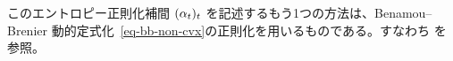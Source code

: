 このエントロピー正則化補間 $(\alpha_t)_t$ を記述するもう1つの方法は、Benamou--Brenier 動的定式化~\eqref{eq-bb-non-cvx}の正則化を用いるものである。すなわち
\citep{gentil2015analogy,chen2016relation}を参照。
